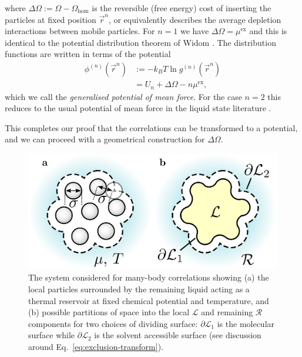 \documentclass[11pt,twoside]{report}
\begin{document}
where $\Delta\Omega := \Omega - \Omega_\mathrm{hom}$ is the reversible (free energy) cost of inserting the particles at fixed position $\vec{r}^n$, or equivalently describes the average depletion interactions between mobile particles.
For $n=1$ we have $\Delta\Omega = \mu^\mathrm{ex}$ and this is identical to the potential distribution theorem of Widom \cite{WidomJCP1963,WidomJPC1982}.
The distribution functions are written in terms of the potential
\begin{equation}\label{eq:potential-mean-force}
  \begin{split}
    \phi^{(n)}(\vec{r}^n) &:=
    - k_B T \ln{g^{(n)}(\vec{r}^n)} \\
    &=
    U_n + \Delta\Omega - n\mu^\mathrm{ex},
  \end{split}
\end{equation}
which we call the \emph{generalised potential of mean force}.
For the case $n=2$ this reduces to the usual potential of mean force in the liquid state literature \cite{Hansen2013}.

This completes our proof that the correlations can be transformed to a potential, and we can proceed with a geometrical construction for $\Delta \Omega$.

\begin{figure}
  \includegraphics[width=\linewidth,outer]{morph-droplet}
  \caption{
    The system considered for many-body correlations showing
    (a) the local particles surrounded by the remaining liquid acting as a thermal reservoir at fixed chemical potential and temperature, and
    (b) possible partitions of space into the local $\mathcal{L}$ and remaining $\mathcal{R}$ components for two choices of dividing surface: $\partial\mathcal{L}_1$ is the molecular surface while $\partial\mathcal{L}_2$ is the solvent accessible surface (see discussion around Eq.\ \eqref{eq:exclusion-transform}).
  }
  \label{fig:system}
\end{figure}
\end{document}
